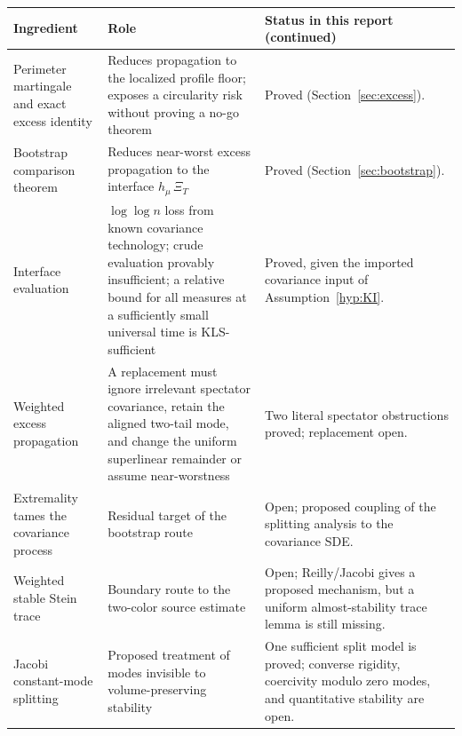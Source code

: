 \documentclass[../../main.tex]{subfiles}
\begin{document}
\begin{center}
\begin{tabularx}{\textwidth}{@{}>{\raggedright\arraybackslash}p{}>{\raggedright\arraybackslash}p{}Y@{}}
\toprule
Ingredient & Role & Status in this report (continued) \\
\midrule
Perimeter martingale and exact excess identity & Reduces propagation to the localized profile floor; exposes a circularity risk without proving a no-go theorem & Proved (Section~\ref{sec:excess}). \\
\addlinespace
Bootstrap comparison theorem & Reduces near-worst excess propagation to the interface $h_\mu\,\Xi_T$ & Proved (Section~\ref{sec:bootstrap}). \\
\addlinespace
Interface evaluation & $\log\log n$ loss from known covariance technology; crude evaluation provably insufficient; a relative bound for all measures at a sufficiently small universal time is KLS-sufficient & Proved, given the imported covariance input of Assumption~\ref{hyp:KI}. \\
\addlinespace
Weighted excess propagation & A replacement must ignore irrelevant spectator covariance, retain
the aligned two-tail mode, and change the uniform superlinear remainder or assume near-worstness
& Two literal spectator obstructions proved; replacement open. \\
\addlinespace
Extremality tames the covariance process & Residual target of the bootstrap route & Open; proposed coupling of the splitting analysis to the covariance SDE. \\
\addlinespace
Weighted stable Stein trace & Boundary route to the two-color source estimate & Open; Reilly/Jacobi gives a proposed mechanism, but a uniform almost-stability trace lemma is still missing. \\
\addlinespace
Jacobi constant-mode splitting & Proposed treatment of modes invisible to volume-preserving stability & One sufficient split model is proved; converse rigidity, coercivity modulo zero modes, and quantitative stability are open. \\
\bottomrule
\end{tabularx}
\end{center}
\end{document}
